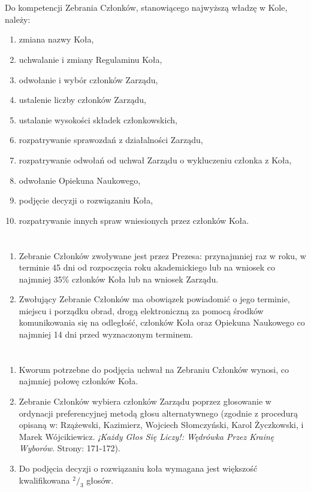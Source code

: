 \documentclass[a4paper]{article}
\begin{document}
\section{}
Do kompetencji Zebrania Członków, stanowiącego najwyższą władzę w Kole, należy:
  \begin{enumerate}[label=\alph*)]
  \item zmiana nazwy Koła,
  \item uchwalanie i zmiany Regulaminu Koła,
  \item odwołanie i wybór członków Zarządu, 
  \item ustalenie liczby członków Zarządu,
  \item ustalanie wysokości składek członkowskich,
  \item rozpatrywanie sprawozdań z działalności Zarządu,
  \item rozpatrywanie odwołań od uchwał Zarządu o wykluczeniu członka z Koła,
  \item odwołanie Opiekuna Naukowego,
  \item podjęcie decyzji o rozwiązaniu Koła,
  \item rozpatrywanie innych spraw wniesionych przez członków Koła.
  \end{enumerate}

\section{}
\label{Tryb}
\begin{enumerate}
\item Zebranie Członków zwoływane jest przez Prezesa: przynajmniej raz w roku, w terminie 45 dni od rozpoczęcia roku akademickiego lub na wniosek co najmniej 35\% członków Koła lub na wniosek Zarządu.
\item Zwołujący Zebranie Członków ma obowiązek powiadomić o jego terminie, miejscu i porządku obrad, drogą elektroniczną za pomocą środków komunikowania się na odległość, członków Koła oraz Opiekuna Naukowego co najmniej 14 dni przed wyznaczonym terminem.
\end{enumerate}

\section{}

\begin{enumerate}
\label{kworum}
\item Kworum potrzebne do podjęcia uchwał na Zebraniu Członków wynosi, co najmniej połowę członków Koła.
\item Zebranie Członków wybiera członków Zarządu poprzez głosowanie w ordynacji preferencyjnej metodą głosu alternatywnego (zgodnie z procedurą opisaną w: Rzążewski, Kazimierz, Wojciech Słomczyński, Karol Życzkowski, i Marek Wójcikiewicz. \textit{¡Każdy Głos Się Liczy!: Wędrówka Przez Krainę Wyborów}. Strony: 171-172).
\item Do podjęcia decyzji o rozwiązaniu koła wymagana jest większość kwalifikowana $^2/_3$ głosów.
\end{enumerate}
\end{document}
